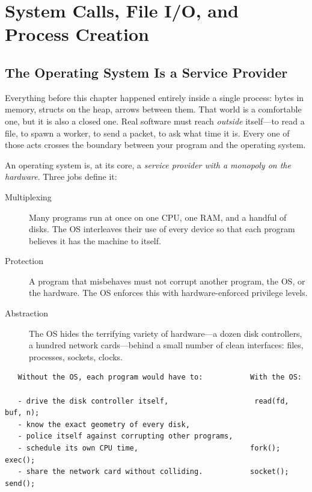 
\chapter{System Calls, File I/O, and Process Creation}

\section{The Operating System Is a Service Provider}

Everything before this chapter happened entirely inside a single
process: bytes in memory, structs on the heap, arrows between them.
That world is a comfortable one, but it is also a closed one. Real
software must reach \emph{outside} itself---to read a file, to spawn a
worker, to send a packet, to ask what time it is. Every one of those
acts crosses the boundary between your program and the operating
system.

An operating system is, at its core, a \emph{service provider with a
monopoly on the hardware}. Three jobs define it:

\begin{description}
  \item[Multiplexing] Many programs run at once on one CPU, one RAM,
    and a handful of disks. The OS interleaves their use of every
    device so that each program believes it has the machine to itself.
  \item[Protection] A program that misbehaves must not corrupt another
    program, the OS, or the hardware. The OS enforces this with
    hardware-enforced privilege levels.
  \item[Abstraction] The OS hides the terrifying variety of hardware---a
    dozen disk controllers, a hundred network cards---behind a small
    number of clean interfaces: files, processes, sockets, clocks.
\end{description}

\begin{verbatim}
   Without the OS, each program would have to:           With the OS:

   - drive the disk controller itself,                    read(fd, buf, n);
   - know the exact geometry of every disk,
   - police itself against corrupting other programs,
   - schedule its own CPU time,                          fork(); exec();
   - share the network card without colliding.           socket(); send();
\end{verbatim}

